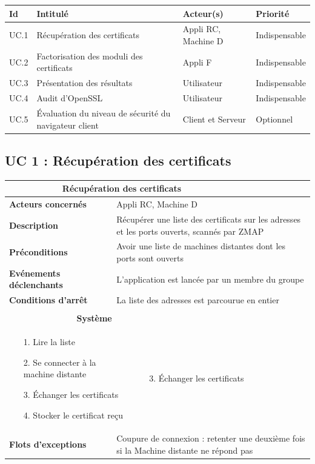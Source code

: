 \documentclass[a4paper,11pt,french]{article}
\newcommand{\fiche}[9] {
	\noindent
\begin{tabular}{|p{4cm}| p{2cm} | p{4cm} | p{.5cm} | p{7cm}|} 
\hline
\rowcolor{blue}
\multicolumn{2}{|l|}{\color{white}\bfseries{Nom}} & \multicolumn{3}{l|}{\color{white}\bfseries{#1}}\\
\hline
\multicolumn{2}{|l|}{\bfseries{Acteurs concernés}} & \multicolumn{3}{m{10.5cm}|}{#2}\\
\hline
\multicolumn{2}{|l|}{\bfseries{Description}} & \multicolumn{3}{m{10.5cm}|}{#3}\\
\hline
\multicolumn{2}{|l|}{\bfseries{Préconditions}} & \multicolumn{3}{m{10.5cm}|}{#4}\\
\hline
\multicolumn{2}{|l|}{\bfseries{Evénements déclenchants}} & \multicolumn{3}{m{10.5cm}|}{#5}\\
\hline
\multicolumn{2}{|l|}{\bfseries{Conditions d'arrêt}} & \multicolumn{3}{m{10.5cm}|}{#6}\\
\hline
\rowcolor{gray}
\multicolumn{5}{|c|}{\bfseries{Description du flot d'événements principal}}\\
\hline
\rowcolor{gray}
\multicolumn{3}{|c|}{\bfseries{Acteur(s)}} & \multicolumn{2}{c|}{\bfseries{Système}}\\
\hline
\multicolumn{3}{|p{7.5cm}|}{#7} & \multicolumn{2}{p{7.5cm}|}{#8}\\
\hline
\multicolumn{2}{|l}{\bfseries{Flots d'exceptions}} & \multicolumn{3}{|p{11.5cm}|}{#9}\\
\hline
\end{tabular}
\\
}
\begin{document}
\begin{center}
\begin{tabular}{|l|p{6cm}|p{6cm}|l|}
\hline
\bfseries{Id} & \bfseries{Intitulé} & \bfseries{Acteur(s)} & \bfseries{Priorité}\\
\hline
UC.1 & Récupération des certificats & Appli RC, Machine D & Indispensable\\
\hline
UC.2 & Factorisation des moduli des certificats & Appli F & Indispensable\\
\hline
UC.3 & Présentation des résultats & Utilisateur & Indispensable\\
\hline
UC.4 & Audit d'OpenSSL & Utilisateur & Indispensable\\
\hline
UC.5 & Évaluation du niveau de sécurité du navigateur client & Client et Serveur & Optionnel\\
\hline
\end{tabular}
\end{center}


\subsection{UC 1 : Récupération des certificats}

\fiche
	{Récupération des certificats} %
	{Appli RC, Machine D} %
	{Récupérer une liste des certificats sur les adresses et les ports ouverts, scannés par ZMAP} %
	{Avoir une liste de machines distantes dont les ports sont ouverts} %
	{L'application est lancée par un membre du groupe} %
	{La liste des adresses est parcourue en entier} %
	{\begin{itemize}  %
		\item [1.] Lire la liste
		\item [2.] Se connecter à la machine distante
		\item [3.] Échanger les certificats
		\item [4.] Stocker le certificat reçu
	 \end{itemize}
	} 
	{\begin{itemize}  %
		\item []
		\item []
		\item [3.] Échanger les certificats
	\end{itemize}
	 }
	{Coupure de connexion : retenter une deuxième fois si la Machine distante ne répond pas} %
\end{document}
